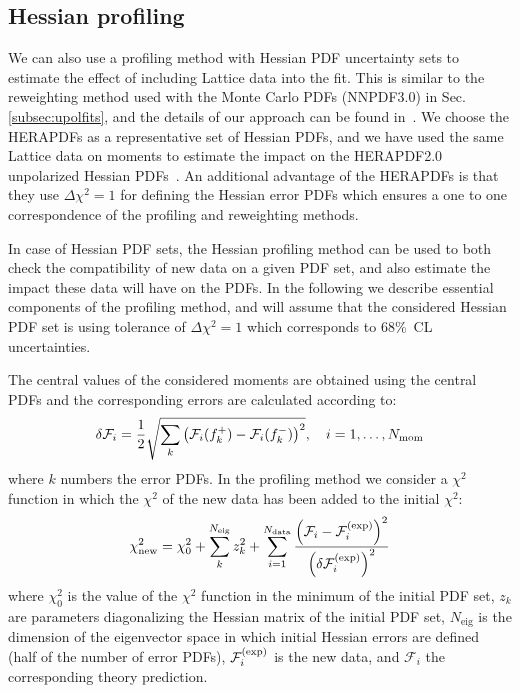 \subsection{Hessian profiling}
\label{sec:hessianprofiling}



We can also use a profiling method with Hessian PDF uncertainty sets  
to estimate the effect of including Lattice data into the fit. 
This is similar to the  reweighting method used with the Monte Carlo PDFs (NNPDF3.0) 
in Sec.\ref{subsec:upolfits},
and the details of our approach can be found in~\cite{Paukkunen:2014zia,Camarda:2015zba}.
%
We choose the HERAPDFs as a representative set of Hessian PDFs, and 
we have used the same Lattice data on moments to estimate the impact
on the HERAPDF2.0 unpolarized Hessian PDFs~\cite{Abramowicz:2015mha}. 
%
An additional advantage of the HERAPDFs is that they use
$\Delta\chi^2=1$ for defining the Hessian error PDFs which ensures a
one to one correspondence of the profiling and reweighting methods.


In case of Hessian PDF sets, the Hessian profiling method
can be used to both check the compatibility of new data on a given PDF set,
and also  estimate the impact these data will have on the PDFs. 
In the following we describe essential components of the profiling method, 
and will assume  that the considered Hessian PDF set is using tolerance of $\Delta\chi^2=1$ 
which corresponds to 68\%~CL uncertainties.



The central values of the considered moments are obtained using the central PDFs and the corresponding
errors are calculated according to:
\begin{equation}
\delta\mathcal{F}_i = \frac{1}{2} \sqrt{\sum_{k}\left(\mathcal{F}_i(f_k^+)-\mathcal{F}_i(f_k^-)\right)^2},
\quad i=1,\ldots,N_{\rm mom}
\end{equation}
where $k$ numbers the error PDFs.
%
In the profiling method we consider a $\chi^2$ function in which the $\chi^2$ of the new
data has been added to the initial $\chi^2$:
\begin{equation}
\label{eq:newchi2}
\chi^2_{\text{new}} = \chi_0^2 + \sum_{k}^{N_{\text{eig}}} z_k^2
                    + \sum_{i=1}^{N_{\text{data}}}
                      \frac{\lp \mathcal{F}_i - \mathcal{F}_i^{\rm(exp)}\rp^2}
                           {\lp\delta\mathcal{F}_i^{\rm(exp)}\rp^2}
\end{equation}
where $\chi^2_0$ is the value of the $\chi^2$ function in the minimum of the initial PDF set,
$z_k$ are parameters diagonalizing the Hessian matrix of the initial PDF set,
$N_{\text{eig}}$ is the dimension of the eigenvector space in which initial Hessian errors are defined
(half of the number of error PDFs), $\mathcal{F}_i^{\rm(exp)}$ is the new data,
and $\mathcal{F}_i$ the corresponding theory prediction.

